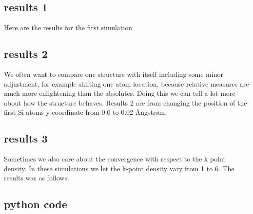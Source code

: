 \documentclass[a4paper,10pt]{article}
\begin{document}
  \subsection{results 1}
  Here are the results for the first simulation
  
  \subsection{results 2}
	We often want to compare one structure with itself including some minor adjustment, for example shifting one atom location, because relative measures are much more enlightening than the absolutes. Doing this we can tell a lot more about how the structure behaves. Results 2 are from changing the position of the first Si atoms y-coordinate from 0.0 to 0.02 Ångstrøm.
  
  \subsection{results 3}
	Sometimes we also care about the convergence with respect to the k point density. In these simulations we let the k-point density vary from 1 to 6. The results was as follows.
  
	
  \subsection{python code}
  
 
  
\end{document}
